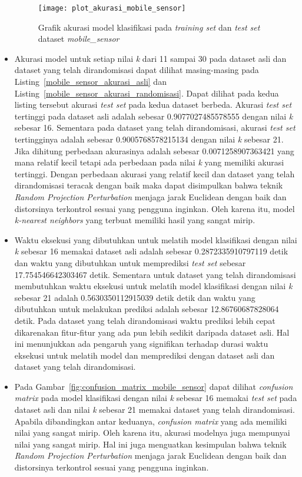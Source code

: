 \begin{itemize}
	\begin{figure}
		\centering
		\texttt{[image: plot\_akurasi\_mobile\_sensor]}
		\caption{Grafik akurasi model klasifikasi pada \textit{training set} dan \textit{test set} dataset \textit{mobile\_sensor}}
		\label{fig:plot_akurasi_mobile_sensor}
	\end{figure}
	\item Akurasi model untuk setiap nilai \textit{k} dari 11 sampai 30 pada dataset asli dan dataset yang telah dirandomisasi dapat dilihat masing-masing pada Listing~\ref{mobile_sensor_akurasi_asli} dan Listing~\ref{mobile_sensor_akurasi_randomisasi}. Dapat dilihat pada kedua listing tersebut akurasi \textit{test set} pada kedua dataset berbeda. Akurasi \textit{test set} tertinggi pada dataset asli adalah sebesar 0.9077027485578555 dengan nilai \textit{k} sebesar 16. Sementara pada dataset yang telah dirandomisasi, akurasi \textit{test set} tertingginya adalah sebesar 0.9005768578215134 dengan nilai \textit{k} sebesar 21. Jika dihitung perbedaan akurasinya adalah sebesar 0.0071258907363421 yang mana relatif kecil tetapi ada perbedaan pada nilai \textit{k} yang memiliki akurasi tertinggi. Dengan perbedaan akurasi yang relatif kecil dan dataset yang telah dirandomisasi teracak dengan baik maka dapat disimpulkan bahwa teknik \textit{Random Projection Perturbation} menjaga jarak Euclidean dengan baik dan distorsinya terkontrol sesuai yang pengguna inginkan. Oleh karena itu, model \textit{k-nearest neighbors} yang terbuat memiliki hasil yang sangat mirip.

	\item Waktu eksekusi yang dibutuhkan untuk melatih model klasifikasi dengan nilai \textit{k} sebesar 16 memakai dataset asli adalah sebesar 0.2872335910797119 detik dan waktu yang dibutuhkan untuk memprediksi \textit{test set} sebesar 17.754546642303467 detik. Sementara untuk dataset yang telah dirandomisasi membutuhkan waktu eksekusi untuk melatih model klasifikasi dengan nilai \textit{k} sebesar 21 adalah 0.5630350112915039 detik detik dan waktu yang dibutuhkan untuk melakukan prediksi adalah sebesar 12.86760687828064 detik. Pada dataset yang telah dirandomisasi waktu prediksi lebih cepat dikarenakan fitur-fitur yang ada pun lebih sedikit daripada dataset asli. Hal ini menunjukkan ada pengaruh yang signifikan terhadap durasi waktu eksekusi untuk melatih model dan memprediksi dengan dataset asli dan dataset yang telah dirandomisasi.
	\item Pada Gambar~\ref{fig:confusion_matrix_mobile_sensor} dapat dilihat \textit{confusion matrix} pada model klasifikasi dengan nilai \textit{k} sebesar 16 memakai \textit{test set} pada dataset asli dan nilai \textit{k} sebesar 21 memakai dataset yang telah dirandomisasi. Apabila dibandingkan antar keduanya, \textit{confusion matrix} yang ada memiliki nilai yang sangat mirip. Oleh karena itu, akurasi modelnya juga mempunyai nilai yang sangat mirip. Hal ini juga menguatkan kesimpulan bahwa teknik \textit{Random Projection Perturbation} menjaga jarak Euclidean dengan baik dan distorsinya terkontrol sesuai yang pengguna inginkan.


\end{itemize}
